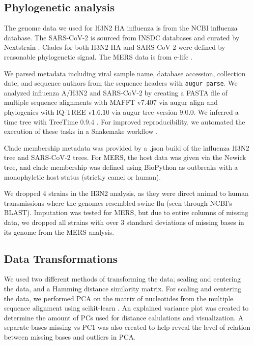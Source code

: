 \documentclass[10pt,letterpaper]{article}
\begin{document}
\subsection*{Phylogenetic analysis}

The genome data we used for H3N2 HA influenza is from the NCBI influenza database.
The SARS-CoV-2 is sourced from INSDC databases and curated by Nextstrain \cite{Hadfield2018}.
Clades for both H3N2 HA and SARS-CoV-2 were defined by reasonable phylogenetic signal.
The MERS data is from e-life \cite{dudas_carvalho_rambaut_bedford_2018}.

We parsed metadata including viral sample name, database accession, collection date, and sequence authors from the sequence headers with \texttt{augur parse}.
We analyzed influenza A/H3N2 and SARS-CoV-2 by creating a FASTA file of multiple sequence alignments with MAFFT v7.407 \cite{Katoh2002} via augur align \cite{Hadfield2018} and phylogenies with IQ-TREE v1.6.10 \cite{Nguyen2014} via augur tree version 9.0.0.
We inferred a time tree with TreeTime 0.9.4 \cite{Sagulenko2018}.
For improved reproducibility, we automated the execution of these tasks in a Snakemake workflow \cite{molder_2021}.

Clade membership metadata was provided by a .json build of the influenza H3N2 tree and SARS-CoV-2 trees.
For MERS, the host data was given via the Newick tree, and clade membership was defined using BioPython as outbreaks with a monophyletic host status (strictly camel or human).

We dropped 4 strains in the H3N2 analysis, as they were direct animal to human transmissions where the genomes resembled swine flu (seen through NCBI's BLAST).
Imputation was tested for MERS, but due to entire columns of missing data, we dropped all strains with over 3 standard deviations of missing bases in its genome from the MERS analysis.

\subsection*{Data Transformations}

We used two different methods of transforming the data; scaling and centering the data, and a Hamming distance similarity matrix.
For scaling and centering the data, we performed PCA on the matrix of nucleotides from the multiple sequence alignment using scikit-learn \cite{jolliffe_cadima_2016}.
An explained variance plot was created to determine the amount of PCs used for distance calulations and visualization.
A separate bases missing vs PC1 was also created to help reveal the level of relation between missing bases and outliers in PCA.
\end{document}
